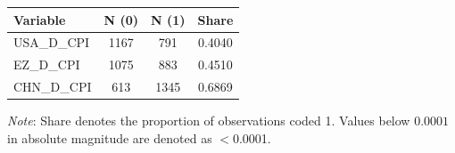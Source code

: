 \begin{tabular}{lccc}
  \toprule
  \textbf{Variable} & \textbf{N (0)} & \textbf{N (1)} & \textbf{Share} \\ 
  \midrule
  USA\_D\_CPI & 1167 & 791 & 0.4040 \\ 
  EZ\_D\_CPI & 1075 & 883 & 0.4510 \\ 
  CHN\_D\_CPI & 613 & 1345 & 0.6869 \\ 
  \bottomrule
\end{tabular}
\par\vspace{4pt}
\begin{minipage}{\linewidth}
  \footnotesize \textit{Note}: Share denotes the proportion of observations coded 1. Values below $0.0001$ in absolute magnitude are denoted as $<$0.0001.
\end{minipage}